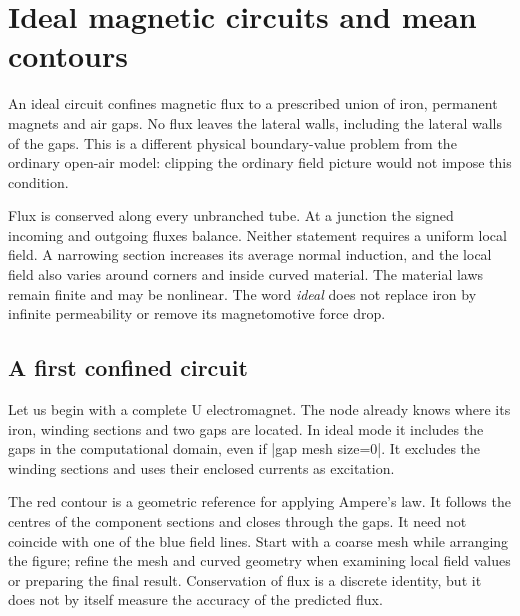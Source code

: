 \section{Ideal magnetic circuits and mean contours}
\label{sec:ideal}
An ideal circuit confines magnetic flux to a prescribed union of iron,
permanent magnets and air gaps. No flux leaves the lateral walls, including
the lateral walls of the gaps. This is a different physical boundary-value
problem from the ordinary open-air model: clipping the ordinary field picture
would not impose this condition.

Flux is conserved along every unbranched tube. At a junction the signed
incoming and outgoing fluxes balance. Neither statement requires a uniform
local field. A narrowing section increases its average normal induction,
and the local field also varies around corners and inside curved material.
The material laws remain finite and may be nonlinear. The word \emph{ideal}
does not replace iron by infinite permeability or remove its magnetomotive
force drop.

\subsection{A first confined circuit}
Let us begin with a complete U electromagnet. The node already knows where
its iron, winding sections and two gaps are located. In ideal mode it includes
the gaps in the computational domain, even if |gap mesh size=0|. It excludes
the winding sections and uses their enclosed currents as excitation.

\begin{codeexample}[width=6cm]
\end{codeexample}

The red contour is a geometric reference for applying Ampere's law. It follows
the centres of the component sections and closes through the gaps. It need
not coincide with one of the blue field lines. Start with a coarse mesh while
arranging the figure; refine the mesh and curved geometry when examining local
field values or preparing the final result. Conservation of flux is a discrete
identity, but it does not by itself measure the accuracy of the predicted flux.

